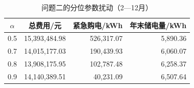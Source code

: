 \par
\begin{table}[!htbp]
\centering
\caption{问题二的分位参数扰动（2—12月）}\label{tab:q2-risk-sensitivity}
\normalsize
\begin{tabular}{lrrr}
\toprule
\multicolumn{1}{c}{$\alpha$} & \multicolumn{1}{c}{总费用/元} & \multicolumn{1}{c}{紧急购电/kWh} & \multicolumn{1}{c}{年末储电量/kWh} \\
\midrule
0.5 & 15,393,484.98 & 526,317.07 & 5,890.36 \\
0.7 & 14,015,177.03 & 190,439.93 & 6,060.07 \\
0.8 & 13,908,175.95 & 102,787.48 & 6,258.37 \\
0.9 & 14,140,389.51 & 40,231.09 & 6,507.64 \\
\bottomrule
\end{tabular}
\end{table}
\par
